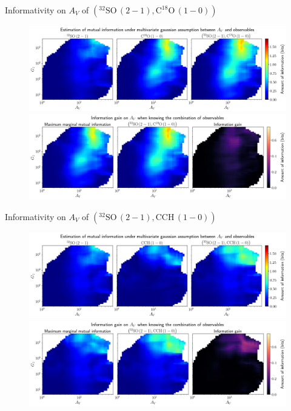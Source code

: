 \documentclass{beamer}
\begin{document}
\begin{frame}{Informativity on $A_V$ of $\left(\mathrm{^{32}SO\,(2-1)},\mathrm{C^{18}O\,(1-0)}\right)$}
    \begin{figure}
        \centering
        \includegraphics[width=0.95\linewidth]{../linearinfo/av__32so21_c18o10_linearinfo.png}
        \vfill
        \includegraphics[width=0.95\linewidth]{../linearinfo/av__32so21_c18o10_linearinfo_gain.png}
    \end{figure}
\end{frame}

\begin{frame}{Informativity on $A_V$ of $\left(\mathrm{^{32}SO\,(2-1)},\mathrm{CCH\,(1-0)}\right)$}
    \begin{figure}
        \centering
        \includegraphics[width=0.95\linewidth]{../linearinfo/av__32so21_cch10_linearinfo.png}
        \vfill
        \includegraphics[width=0.95\linewidth]{../linearinfo/av__32so21_cch10_linearinfo_gain.png}
    \end{figure}
\end{frame}
\end{document}
